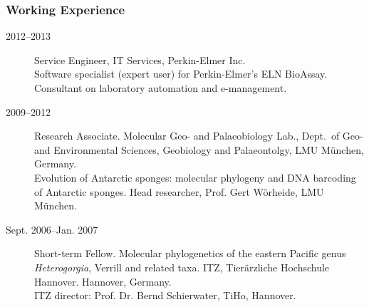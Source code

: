 \documentclass[letter,10pt]{article}
\begin{document}
\subsubsection*{Working Experience}
\begin{description}
\item [2012--2013] Service Engineer, IT Services, Perkin-Elmer Inc.\\Software specialist (expert user) for Perkin-Elmer's ELN BioAssay. Consultant on laboratory automation and e-management.

\item[2009--2012] Research Associate. Molecular Geo- and Palaeobiology Lab., Dept.~of Geo- and Environmental Sciences, Geobiology and Palaeontolgy, LMU M\"unchen, Germany.\\ Evolution of Antarctic sponges: molecular phylogeny and DNA barcoding of Antarctic sponges.
Head researcher, Prof. Gert W\"orheide, LMU M\"unchen.

\item[Sept. 2006--Jan. 2007] Short-term Fellow. Molecular phylogenetics of the eastern Pacific genus \emph{Heterogorgia}, Verrill and related taxa. ITZ, Tier\"arzliche Hochschule Hannover. Hannover, Germany.\\
ITZ director: Prof. Dr. Bernd Schierwater, TiHo, Hannover.





\end{description}
\end{document}
